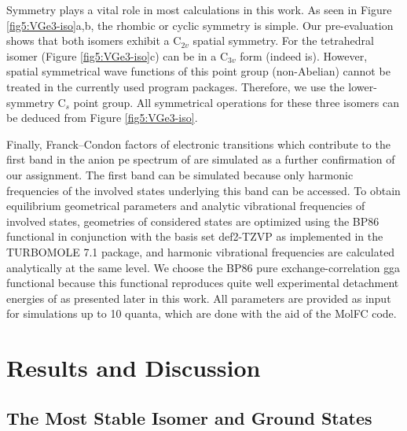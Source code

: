 \begin{refsection}
Symmetry plays a vital role in most calculations in this work. As seen in Figure \ref{fig5:VGe3-iso}a,b, the rhombic or cyclic symmetry is simple. Our pre-evaluation shows that both isomers exhibit a C$_{2v}$ spatial symmetry. For the tetrahedral isomer (Figure \ref{fig5:VGe3-iso}c)  can be in a C$_{3v}$ form (indeed  is). However, spatial symmetrical wave functions of this point group (non-Abelian) cannot be treated in the currently used program packages. Therefore, we use the lower-symmetry C$_s$ point group. All symmetrical operations for these three isomers can be deduced from Figure \ref{fig5:VGe3-iso}.




Finally, Franck–Condon factors of electronic transitions which contribute to the first band in the anion \acrshort{pe} spectrum of  are simulated as a further confirmation of our assignment. The first band can be simulated because only harmonic frequencies of the involved states underlying this band can be accessed. To obtain equilibrium geometrical parameters and analytic vibrational frequencies of involved states, geometries of considered states are optimized using the BP86 functional in conjunction with the basis set def2-TZVP \cite{c5:29} as implemented in the TURBOMOLE 7.1 package, \cite{c5:30} and harmonic vibrational frequencies are calculated analytically at the same level. We choose the BP86 pure exchange-correlation \acrshort{gga} functional because this functional reproduces quite well experimental detachment energies of  as presented later in this work. All parameters are provided as input for simulations up to 10 quanta, which are done with the aid of the MolFC code. \cite{c5:31} 




\section{Results and Discussion}

\subsection{The Most Stable Isomer and Ground States}



\end{refsection}
